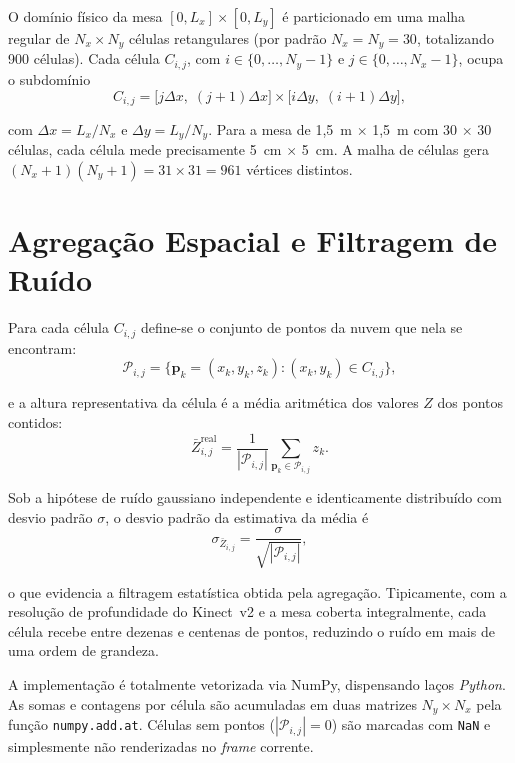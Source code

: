 O domínio físico da mesa $[0, L_x] \times [0, L_y]$ é particionado em
uma malha regular de $N_x \times N_y$ células retangulares (por padrão
$N_x = N_y = 30$, totalizando 900 células). Cada célula $C_{i,j}$,
com $i \in \{0, \ldots, N_y - 1\}$ e $j \in \{0, \ldots, N_x - 1\}$,
ocupa o subdomínio
\begin{equation}
C_{i,j} = \big[ j \Delta x,\; (j+1) \Delta x \big]
        \times \big[ i \Delta y,\; (i+1) \Delta y \big],
\end{equation}

\noindent com $\Delta x = L_x / N_x$ e $\Delta y = L_y / N_y$. Para a
mesa de 1,5~m$\,\times\,$1,5~m com 30$\,\times\,$30 células, cada célula
mede precisamente 5~cm$\,\times\,$5~cm. A malha de células gera
$(N_x + 1)(N_y + 1) = 31 \times 31 = 961$ vértices distintos.

\section{Agregação Espacial e Filtragem de Ruído}
\label{sec:agregacao}

Para cada célula $C_{i,j}$ define-se o conjunto de pontos da nuvem que
nela se encontram:
\begin{equation}
\mathcal{P}_{i,j} = \big\{ \mathbf{p}_k = (x_k, y_k, z_k) :
    (x_k, y_k) \in C_{i,j} \big\},
\end{equation}

\noindent e a altura representativa da célula é a média aritmética dos
valores $Z$ dos pontos contidos:
\begin{equation}
\bar{Z}^{\text{real}}_{i,j} = \frac{1}{|\mathcal{P}_{i,j}|}
        \sum_{\mathbf{p}_k \in \mathcal{P}_{i,j}} z_k.
\end{equation}

Sob a hipótese de ruído gaussiano independente e identicamente
distribuído com desvio padrão $\sigma$, o desvio padrão da estimativa
da média é
\begin{equation}
\sigma_{\bar{Z}_{i,j}} = \frac{\sigma}{\sqrt{|\mathcal{P}_{i,j}|}},
\end{equation}

\noindent o que evidencia a filtragem estatística obtida pela
agregação. Tipicamente, com a resolução de profundidade do Kinect~v2 e a
mesa coberta integralmente, cada célula recebe entre dezenas e centenas
de pontos, reduzindo o ruído em mais de uma ordem de grandeza.

A implementação é totalmente vetorizada via NumPy, dispensando laços
\textit{Python}. As somas e contagens por célula são acumuladas em
duas matrizes $N_y \times N_x$ pela função \texttt{numpy.add.at}.
Células sem pontos ($|\mathcal{P}_{i,j}| = 0$) são marcadas com
\texttt{NaN} e simplesmente não renderizadas no
\textit{frame} corrente.

